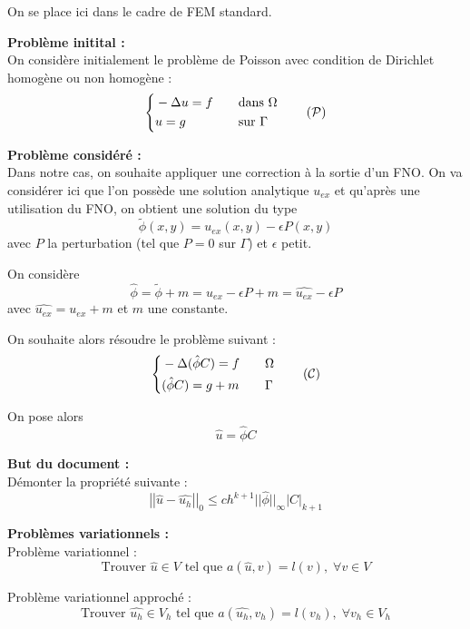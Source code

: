 On se place ici dans le cadre de FEM standard. 

\textbf{Problème initital :} \\
On considère initialement le problème de Poisson avec condition de Dirichlet homogène ou non homogène :
\begin{equation}
	\left\{\begin{aligned}
		&-\Delta u=f \quad &&\text{dans } \Omega \\
		&u=g \quad &&\text{sur } \Gamma
	\end{aligned}\right. \label{pb_initial} \tag{$\mathcal{P}$}
\end{equation}

\textbf{Problème considéré :} \\
Dans notre cas, on souhaite appliquer une correction à la sortie d'un FNO.
On va considérer ici que l'on possède une solution analytique $u_{ex}$ et qu'après une utilisation du FNO, on obtient une solution du type
$$\tilde{\phi}(x,y) = u_{ex}(x,y)-\epsilon P(x,y)$$
avec $P$ la perturbation (tel que $P=0$ sur $\Gamma$) et $\epsilon$ petit.

On considère
$$\hat{\phi}=\tilde{\phi}+m=u_{ex}-\epsilon P+m=\widehat{u_{ex}}-\epsilon P$$
avec $\widehat{u_{ex}}=u_{ex}+m$ et $m$ une constante.

On souhaite alors résoudre le problème suivant :
\begin{equation}
	\left\{\begin{aligned}
		&-\Delta (\hat{\phi}C)=f \quad &&\Omega \\
		&(\hat{\phi}C)=g+m \quad &&\Gamma
	\end{aligned}\right. \label{pb_reh} \tag{$\mathcal{C}$}
\end{equation}

On pose alors
$$\hat{u}=\hat{\phi}C$$

\textbf{But du document :} \\
Démonter la propriété suivante :
\begin{equation}
	\left|\left|\hat{u}-\hat{u_h}\right|\right|_0\le ch^{k+1}||\hat{\phi}||_\infty\left|C\right|_{k+1}
	\label{ine_a_dem}
\end{equation}

\textbf{Problèmes variationnels :} \\

Problème variationnel :
$$\text{Trouver } \hat{u}\in V \text{ tel que } a(\hat{u},v)=l(v), \;\forall v\in V$$

Problème variationnel approché :
$$\text{Trouver } \hat{u_h}\in V_h \text{ tel que } a(\hat{u_h},v_h)=l(v_h), \;\forall v_h\in V_h$$

